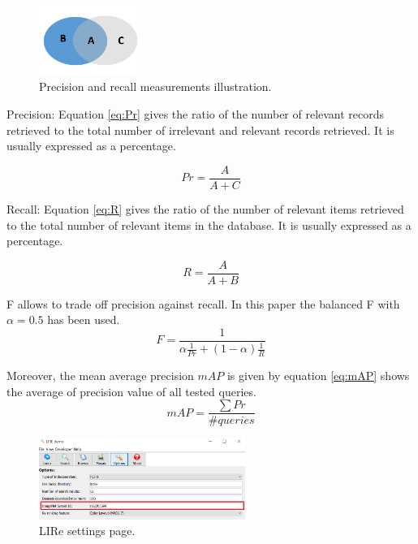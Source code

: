 \documentclass[11pt]{article}
\begin{document}
\begin{figure}[h]
\centering
\includegraphics[width=0.3\textwidth]{measurements}
\caption{Precision and recall measurements illustration.}
\label{fig:measurements}
\end{figure}

Precision: Equation \ref{eq:Pr} gives the ratio of the number of relevant
records retrieved to the total number of irrelevant and
relevant records retrieved. It is usually expressed as a
percentage.

	\begin{equation}\label{eq:Pr}	
	  Pr = \frac{A}{A + C}
	\end{equation}
	
Recall: Equation \ref{eq:R} gives the ratio of the number of relevant items
retrieved to the total number of relevant items in the
database. It is usually expressed as a percentage.

	\begin{equation}\label{eq:R}
	  R = \frac{A}{A + B}	
	\end{equation}
	
F allows to trade off precision against recall.	 In this paper the balanced F with $\alpha = 0.5$ has been used.
	\begin{equation} \label{eq:F}
	F = \frac{1}{\alpha \frac{1}{Pr} + (1 - \alpha)\frac{1}{R}}
	\end{equation}


Moreover, the mean average precision $mAP$ is given by equation \ref{eq:mAP} shows the average of precision value of all tested queries.
	\begin{equation} \label{eq:mAP}
	   mAP = \frac{\sum{Pr}}{\#queries}
	\end{equation}

\begin{figure}[h]
\centering
\includegraphics[width=0.6\textwidth]{lireSettingPage}
\caption{LIRe settings page.}
\label{fig:lireSettingsPage}
\end{figure}
\end{document}
